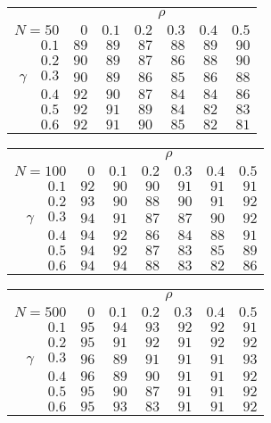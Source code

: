 \begin{tabular}{r|rrrrrr}
\hline\hline
 &\multicolumn{6}{c}{$\rho$} \\ 
 $N = 50$ & $0$ & $0.1$ & $0.2$ & $0.3$ & $0.4$ & $0.5$ \\ 
 \hline$0.1$ & $89$ & $89$ & $87$ & $88$ & $89$ & $90$\\ 
$0.2$ & $90$ & $89$ & $87$ & $86$ & $88$ & $90$\\ 
$\gamma\quad$$0.3$ & $90$ & $89$ & $86$ & $85$ & $86$ & $88$\\ 
$0.4$ & $92$ & $90$ & $87$ & $84$ & $84$ & $86$\\ 
$0.5$ & $92$ & $91$ & $89$ & $84$ & $82$ & $83$\\ 
$0.6$ & $92$ & $91$ & $90$ & $85$ & $82$ & $81$\\ 
 \hline 
 \end{tabular}
 
 \vspace{2em} 
 
\begin{tabular}{r|rrrrrr}
\hline\hline
 &\multicolumn{6}{c}{$\rho$} \\ 
 $N = 100$ & $0$ & $0.1$ & $0.2$ & $0.3$ & $0.4$ & $0.5$ \\ 
 \hline$0.1$ & $92$ & $90$ & $90$ & $91$ & $91$ & $91$\\ 
$0.2$ & $93$ & $90$ & $88$ & $90$ & $91$ & $92$\\ 
$\gamma\quad$$0.3$ & $94$ & $91$ & $87$ & $87$ & $90$ & $92$\\ 
$0.4$ & $94$ & $92$ & $86$ & $84$ & $88$ & $91$\\ 
$0.5$ & $94$ & $92$ & $87$ & $83$ & $85$ & $89$\\ 
$0.6$ & $94$ & $94$ & $88$ & $83$ & $82$ & $86$\\ 
 \hline 
 \end{tabular}
 
 \vspace{2em} 
 
\begin{tabular}{r|rrrrrr}
\hline\hline
 &\multicolumn{6}{c}{$\rho$} \\ 
 $N = 500$ & $0$ & $0.1$ & $0.2$ & $0.3$ & $0.4$ & $0.5$ \\ 
 \hline$0.1$ & $95$ & $94$ & $93$ & $92$ & $92$ & $91$\\ 
$0.2$ & $95$ & $91$ & $92$ & $91$ & $92$ & $92$\\ 
$\gamma\quad$$0.3$ & $96$ & $89$ & $91$ & $91$ & $91$ & $93$\\ 
$0.4$ & $96$ & $89$ & $90$ & $91$ & $91$ & $92$\\ 
$0.5$ & $95$ & $90$ & $87$ & $91$ & $91$ & $92$\\ 
$0.6$ & $95$ & $93$ & $83$ & $91$ & $91$ & $92$\\ 
 \hline 
 \end{tabular}